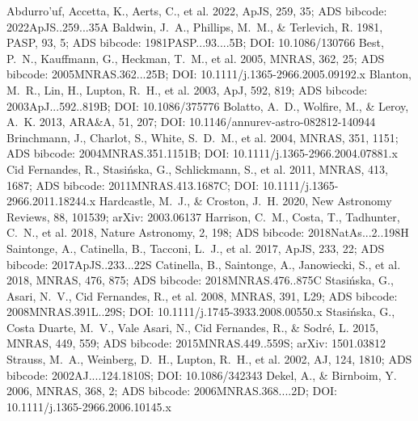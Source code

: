 \documentclass[twocolumn]{aastex631}
\begin{document}

\begin{thebibliography}{}
 Abdurro'uf, Accetta, K., Aerts, C., et al. 2022, ApJS, 259, 35; ADS bibcode: 2022ApJS..259...35A
 Baldwin, J.~A., Phillips, M.~M., \& Terlevich, R. 1981, PASP, 93, 5; ADS bibcode: 1981PASP...93....5B; DOI: 10.1086/130766
 Best, P.~N., Kauffmann, G., Heckman, T.~M., et al. 2005, MNRAS, 362, 25; ADS bibcode: 2005MNRAS.362...25B; DOI: 10.1111/j.1365-2966.2005.09192.x
 Blanton, M.~R., Lin, H., Lupton, R.~H., et al. 2003, ApJ, 592, 819; ADS bibcode: 2003ApJ...592..819B; DOI: 10.1086/375776
 Bolatto, A.~D., Wolfire, M., \& Leroy, A.~K. 2013, ARA\&A, 51, 207; DOI: 10.1146/annurev-astro-082812-140944
 Brinchmann, J., Charlot, S., White, S.~D.~M., et al. 2004, MNRAS, 351, 1151; ADS bibcode: 2004MNRAS.351.1151B; DOI: 10.1111/j.1365-2966.2004.07881.x
 Cid Fernandes, R., Stasi{\'n}ska, G., Schlickmann, S., et al. 2011, MNRAS, 413, 1687; ADS bibcode: 2011MNRAS.413.1687C; DOI: 10.1111/j.1365-2966.2011.18244.x
 Hardcastle, M.~J., \& Croston, J.~H. 2020, New Astronomy Reviews, 88, 101539; arXiv: 2003.06137
 Harrison, C.~M., Costa, T., Tadhunter, C.~N., et al. 2018, Nature Astronomy, 2, 198; ADS bibcode: 2018NatAs...2..198H
 Saintonge, A., Catinella, B., Tacconi, L.~J., et al. 2017, ApJS, 233, 22; ADS bibcode: 2017ApJS..233...22S
 Catinella, B., Saintonge, A., Janowiecki, S., et al. 2018, MNRAS, 476, 875; ADS bibcode: 2018MNRAS.476..875C
 Stasi{\'n}ska, G., Asari, N.~V., Cid Fernandes, R., et al. 2008, MNRAS, 391, L29; ADS bibcode: 2008MNRAS.391L..29S; DOI: 10.1111/j.1745-3933.2008.00550.x
 Stasi{\'n}ska, G., Costa Duarte, M.~V., Vale Asari, N., Cid Fernandes, R., \& Sodr{\'e}, L. 2015, MNRAS, 449, 559; ADS bibcode: 2015MNRAS.449..559S; arXiv: 1501.03812
 Strauss, M.~A., Weinberg, D.~H., Lupton, R.~H., et al. 2002, AJ, 124, 1810; ADS bibcode: 2002AJ....124.1810S; DOI: 10.1086/342343
 Dekel, A., \& Birnboim, Y. 2006, MNRAS, 368, 2; ADS bibcode: 2006MNRAS.368....2D; DOI: 10.1111/j.1365-2966.2006.10145.x

\end{thebibliography}
\end{document}

